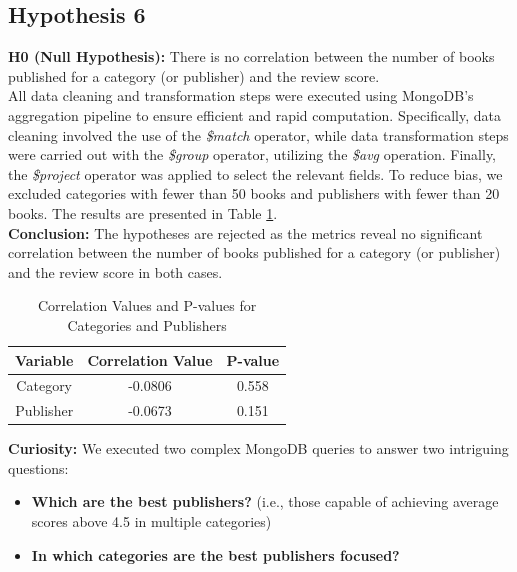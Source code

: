 \subsection*{Hypothesis 6}

\textbf{H0 (Null Hypothesis):} There is no correlation between the number of books published for a category (or publisher) and the review score.\\
All data cleaning and transformation steps were executed using MongoDB's aggregation pipeline to ensure efficient and rapid computation.
Specifically, data cleaning involved the use of the \textit{\$match} operator, while data transformation steps were carried out with
the \textit{\$group} operator, utilizing the \textit{\$avg} operation. Finally, the \textit{\$project} operator was applied to select
the relevant fields. To reduce bias, we excluded categories with fewer than 50 books and publishers with fewer than 20 books.
The results are presented in Table \ref{tab:h6_correlations}.\\
\textbf{Conclusion:} The hypotheses are rejected as the metrics reveal no significant correlation between the number of books published
for a category (or publisher) and the review score in both cases.

\begin{table}[H]
    \footnotesize
    \centering
    \caption{Correlation Values and P-values for Categories and Publishers}
    \begin{tabular}{|c|c|c|}
        \hline
        \textbf{Variable} & \textbf{Correlation Value} & \textbf{P-value} \\
        \hline
        Category          & -0.0806                    & 0.558            \\
        \hline
        Publisher         & -0.0673                    & 0.151            \\
        \hline
    \end{tabular}
    \label{tab:h6_correlations}
\end{table}

\textbf{Curiosity:}
We executed two complex MongoDB queries to answer two intriguing questions:

\begin{itemize}[leftmargin=*, noitemsep]
    \item \textbf{Which are the best publishers?} (i.e., those capable of achieving average scores above 4.5 in multiple categories)
    \item \textbf{In which categories are the best publishers focused?}
\end{itemize}

